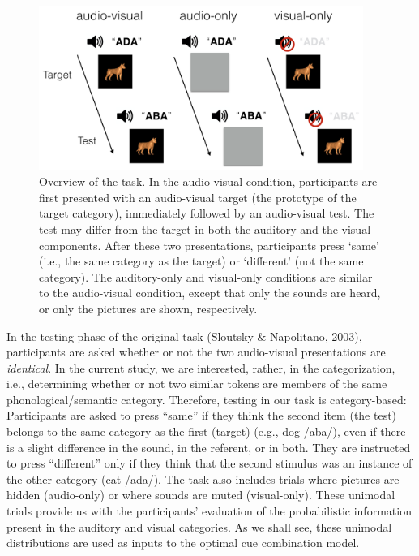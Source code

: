 \documentclass[english,floatsintext,man]{apa6}
\theoremstyle{definition}
\theoremstyle{definition}
\theoremstyle{definition}
\theoremstyle{remark}
\begin{document}
\begin{figure}

{\centering \includegraphics[width=400px]{pictures/task} 

}

\caption{Overview of the task. In the audio-visual condition, participants are first presented with an audio-visual target (the prototype of the target category), immediately followed by an audio-visual test. The test may differ from the target in both the auditory and the visual components. After these two presentations, participants press `same' (i.e., the same category as the target) or `different' (not the same category). The auditory-only and visual-only conditions are similar to the audio-visual condition, except that only the sounds are heard, or only the pictures are shown, respectively.}\label{fig:task}
\end{figure}

In the testing phase of the original task (Sloutsky \& Napolitano,
2003), participants are asked whether or not the two audio-visual
presentations are \emph{identical}. In the current study, we are
interested, rather, in the categorization, i.e., determining whether or
not two similar tokens are members of the same phonological/semantic
category. Therefore, testing in our task is category-based: Participants
are asked to press \enquote{same} if they think the second item (the
test) belongs to the same category as the first (target) (e.g.,
dog-/aba/), even if there is a slight difference in the sound, in the
referent, or in both. They are instructed to press \enquote{different}
only if they think that the second stimulus was an instance of the other
category (cat-/ada/). The task also includes trials where pictures are
hidden (audio-only) or where sounds are muted (visual-only). These
unimodal trials provide us with the participants' evaluation of the
probabilistic information present in the auditory and visual categories.
As we shall see, these unimodal distributions are used as inputs to the
optimal cue combination model.
\end{document}
